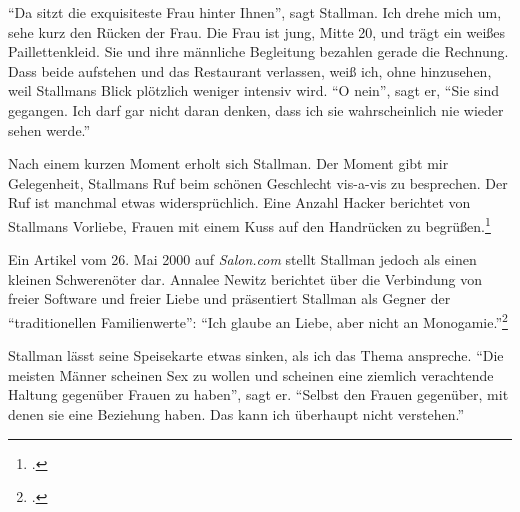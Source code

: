 "`Da sitzt die exquisiteste Frau hinter Ihnen"', sagt Stallman.
Ich drehe mich um, sehe kurz den Rücken der Frau. Die Frau ist jung, Mitte 20, und trägt ein weißes Paillettenkleid. Sie und ihre männliche Begleitung bezahlen gerade die Rechnung. Dass beide aufstehen und das Restaurant verlassen, weiß ich, ohne hinzusehen, weil Stallmans Blick plötzlich weniger intensiv wird.
"`O nein"', sagt er, "`Sie sind gegangen. Ich darf gar nicht daran denken, dass ich sie wahrscheinlich nie wieder sehen werde."'

Nach einem kurzen Moment erholt sich Stallman. Der Moment gibt mir Gelegenheit, Stallmans Ruf beim schönen Geschlecht vis-a-vis zu besprechen. Der Ruf ist manchmal etwas widersprüchlich. Eine Anzahl Hacker berichtet von Stallmans Vorliebe, Frauen mit einem Kuss auf den Handrücken zu begrüßen.\footcite[Vgl.][]{maeling}
%

Ein Artikel vom 26. Mai 2000 auf \textit{Salon.com} stellt Stallman jedoch als einen kleinen Schwerenöter dar. Annalee Newitz berichtet über die Verbindung von freier Software und freier Liebe und präsentiert Stallman als Gegner der "`traditionellen Familienwerte"': "`Ich glaube an Liebe, aber nicht an Monogamie."'\footcite[Vgl.][]{freecodefreeme}

Stallman lässt seine Speisekarte etwas sinken, als ich das Thema anspreche. "`Die meisten Männer scheinen Sex zu wollen und scheinen eine ziemlich verachtende Haltung gegenüber Frauen zu haben"', sagt er. "`Selbst den Frauen gegenüber, mit denen sie eine Beziehung haben. Das kann ich überhaupt nicht verstehen."'

